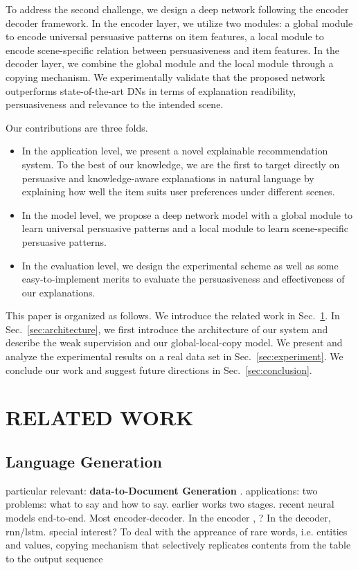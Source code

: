 \documentclass[sigconf]{acmart}
\begin{document}
To address the second challenge, we design a deep network following the encoder decoder framework. In the encoder layer, we utilize two modules: a global module to encode universal persuasive patterns on item features, a local module to encode scene-specific relation between persuasiveness and item features. In the decoder layer, we combine the global module and the local module through a copying mechanism. We experimentally validate that the proposed network outperforms state-of-the-art DNs in terms of explanation readibility, persuasiveness and relevance to the intended scene. 

Our contributions are three folds.
\begin{itemize}
\item In the application level, we present a novel explainable recommendation system. To the best of our knowledge, we are the first to target directly on persuasive and knowledge-aware explanations in natural language by explaining how well the item suits user preferences under different scenes.
\item In the model level, we propose a deep network model with a global module to learn universal persuasive patterns and a local module to learn scene-specific persuasive patterns.
\item In the evaluation level, we design the experimental scheme as well as some easy-to-implement merits to evaluate the persuasiveness and effectiveness of our explanations. 
\end{itemize}


This paper is organized as follows. We introduce the related work in Sec.~\ref{sec:related}. In Sec.~\ref{sec:architecture}, we first introduce the architecture of our system and describe the weak supervision and our global-local-copy model. We present and analyze the experimental results on a real data set in Sec.~\ref{sec:experiment}. We conclude our work and suggest future directions in Sec.~\ref{sec:conclusion}.

\section{RELATED WORK}\label{sec:related}

\subsection{Language Generation}
particular relevant: 
\textbf{data-to-Document Generation }. applications: 
 two problems: what to say and how to say. earlier works two stages. recent neural models end-to-end. Most encoder-decoder. In the encoder , ? In the decoder, rnn/lstm. special interest? To deal with the appreance of rare words, i.e. entities and values,  copying mechanism that selectively replicates contents from the table to the output sequence~\cite{Bao2019Text}
 
\end{document}
